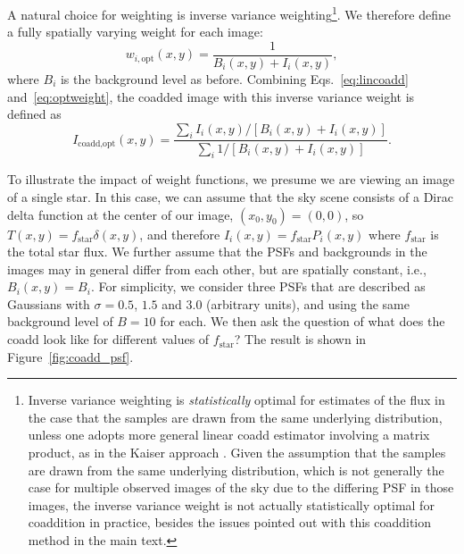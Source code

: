 \documentclass{openjournal}
\newcommand{\irresponse}[1]{{#1}}
\newcommand{\refresponse}[1]{#1}
\begin{document}
A natural choice for weighting is inverse variance weighting\footnote{Inverse variance weighting is {\em statistically} optimal \refresponse{for estimates of the flux in the case that the samples are drawn from the same underlying distribution,} unless one adopts more general linear coadd estimator involving a matrix product, as in the Kaiser approach \refresponse{\citep{Kaiser}}. 
 \refresponse{Given the assumption that the samples are drawn from the same underlying distribution, which is not generally the case for multiple observed images of the sky due to the differing PSF in those images, the inverse variance weight is not actually statistically optimal for coaddition in practice, besides the issues pointed out with this coaddition method in the main text.}}.  We therefore define a fully spatially \refresponse{varying weight} for each image:
\begin{equation}\label{eq:optweight}
    w_{i,\text{opt}}(x,y) = \frac{1}{B_i(x,y)+I_i(x,y)},
\end{equation}
\irresponse{where $B_i$ is the background level as before.} 
Combining Eqs.~\eqref{eq:lincoadd} and~\eqref{eq:optweight}, the coadded image with this \refresponse{inverse variance} weight is defined as
\begin{equation}\label{eq:optcoadd}
    I_\text{coadd,opt}(x,y) = \frac{\sum_i I_i(x,y)/\left[B_i(x,y)+I_i(x,y)\right]}{\sum_i 1/\left[B_i(x,y)+I_i(x,y)\right]}.
\end{equation}

To illustrate the impact of weight functions, we presume we are viewing an image of a single star.  In this case, we can assume that the sky scene consists of a \irresponse{Dirac} delta function at the center of our image, $(x_0,y_0) = (0,0)$, so  $T(x,y)=f_\text{star}\delta(x,y)$, and therefore $I_i(x,y)=f_\text{star}P_i(x,y)$ where $f_\text{star}$ is the total star flux.  We further assume that the PSFs and backgrounds in the images \irresponse{may} in general differ from each other, but are spatially constant, i.e., $B_i(x,y)=B_i$.  For simplicity, we consider three PSFs that are described as Gaussians with $\sigma=0.5$, $1.5$ and $3.0$ (arbitrary units), and using the same background level of $B=10$ for each.  We then ask the question of what does the coadd look like for different values of $f_\text{star}$?  The result is shown in Figure~\ref{fig:coadd_psf}.
\end{document}

